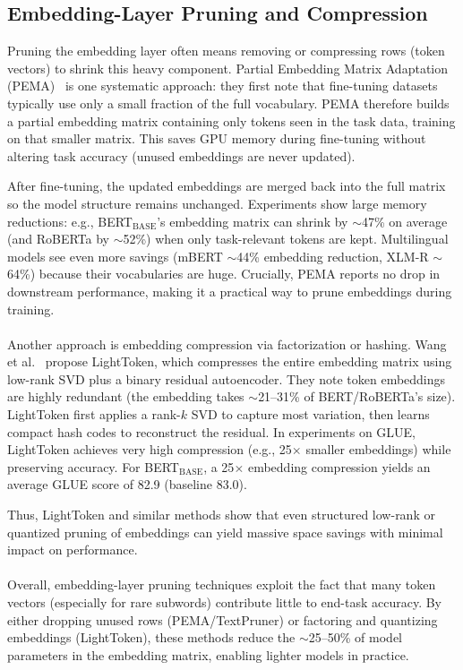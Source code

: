 \documentclass[twocolumn]{article}
\begin{document}
\subsection{Embedding-Layer Pruning and Compression}

Pruning the embedding layer often means removing or compressing rows (token vectors) to shrink this heavy component. Partial Embedding Matrix Adaptation (PEMA)~\cite{bousquet2023pema} is one systematic approach: they first note that fine-tuning datasets typically use only a small fraction of the full vocabulary. PEMA therefore builds a partial embedding matrix containing only tokens seen in the task data, training on that smaller matrix. This saves GPU memory during fine-tuning without altering task accuracy (unused embeddings are never updated).

After fine-tuning, the updated embeddings are merged back into the full matrix so the model structure remains unchanged. Experiments show large memory reductions: e.g., BERT$_{\text{BASE}}$'s embedding matrix can shrink by $\sim$47\% on average (and RoBERTa by $\sim$52\%) when only task-relevant tokens are kept. Multilingual models see even more savings (mBERT $\sim$44\% embedding reduction, XLM-R $\sim$64\%) because their vocabularies are huge. Crucially, PEMA reports no drop in downstream performance, making it a practical way to prune embeddings during training.
\\
\\
Another approach is embedding compression via factorization or hashing. Wang et al.~\cite{wang2023lighttoken} propose LightToken, which compresses the entire embedding matrix using low-rank SVD plus a binary residual autoencoder. They note token embeddings are highly redundant (the embedding takes $\sim$21--31\% of BERT/RoBERTa's size). LightToken first applies a rank-$k$ SVD to capture most variation, then learns compact hash codes to reconstruct the residual. In experiments on GLUE, LightToken achieves very high compression (e.g., 25$\times$ smaller embeddings) while preserving accuracy. For BERT$_{\text{BASE}}$, a 25$\times$ embedding compression yields an average GLUE score of 82.9 (baseline 83.0).

Thus, LightToken and similar methods show that even structured low-rank or quantized pruning of embeddings can yield massive space savings with minimal impact on performance. 
\\
\\
Overall, embedding-layer pruning techniques exploit the fact that many token vectors (especially for rare subwords) contribute little to end-task accuracy. By either dropping unused rows (PEMA/TextPruner) or factoring and quantizing embeddings (LightToken), these methods reduce the $\sim$25--50\% of model parameters in the embedding matrix, enabling lighter models in practice.
\end{document}
